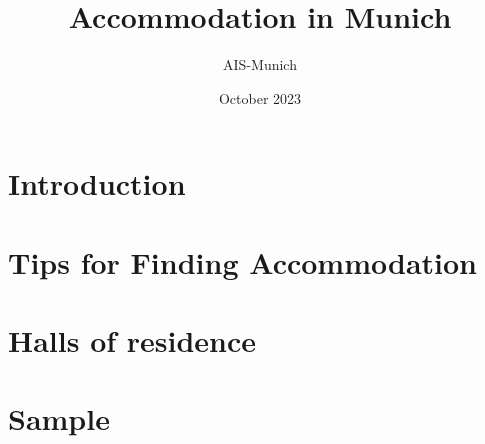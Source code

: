 \documentclass[11pt,twoside,a4paper]{article}
\title{Accommodation in Munich}
\author{AIS-Munich}
\date{October 2023}
\begin{document}
\maketitle
\newpage
\tableofcontents
\newpage
\section{Introduction}

\newpage


\section{Tips for Finding Accommodation}

\newpage

\section{Halls of residence}

\newpage

\section{Sample}


\end{document}
